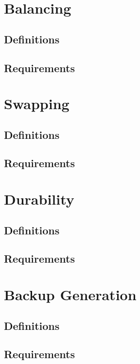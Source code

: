 \documentclass[a4paper, 12pt]{book}
\begin{document}
\chapter{Balancing}

\section{Definitions}

\label{def:balancing-account} 

\section{Requirements}


\chapter{Swapping}

\section{Definitions}

\section{Requirements}

 
\chapter{Durability}
\label{sec:durability}

\section{Definitions}

\section{Requirements}
 
 
\chapter{Backup Generation}
 

\section{Definitions}

\section{Requirements}
 
\end{document}
